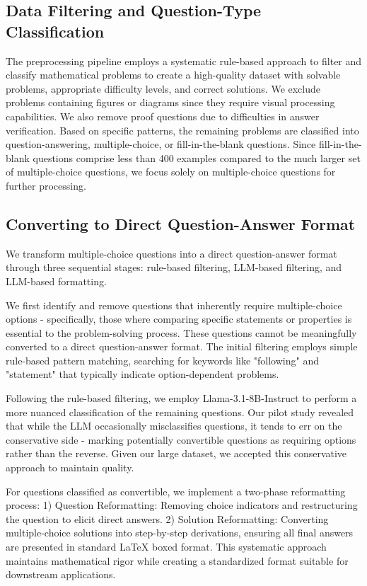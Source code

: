\subsection{Data Filtering and Question-Type Classification}

The preprocessing pipeline employs a systematic rule-based approach to filter and classify mathematical problems to create a high-quality dataset with solvable problems, appropriate difficulty levels, and correct solutions. We exclude problems containing figures or diagrams since they require visual processing capabilities. We also remove proof questions due to difficulties in answer verification. Based on specific patterns, the remaining problems are classified into question-answering, multiple-choice, or fill-in-the-blank questions. Since fill-in-the-blank questions comprise less than 400 examples compared to the much larger set of multiple-choice questions, we focus solely on multiple-choice questions for further processing.

\subsection{Converting to Direct Question-Answer Format}


We transform multiple-choice questions into a direct question-answer format through three sequential stages: rule-based filtering, LLM-based filtering, and LLM-based formatting.

We first identify and remove questions that inherently require multiple-choice options - specifically, those where comparing specific statements or properties is essential to the problem-solving process. These questions cannot be meaningfully converted to a direct question-answer format. The initial filtering employs simple rule-based pattern matching, searching for keywords like "following" and "statement" that typically indicate option-dependent problems.

Following the rule-based filtering, we employ Llama-3.1-8B-Instruct to perform a more nuanced classification of the remaining questions. Our pilot study revealed that while the LLM occasionally misclassifies questions, it tends to err on the conservative side - marking potentially convertible questions as requiring options rather than the reverse. Given our large dataset, we accepted this conservative approach to maintain quality.

For questions classified as convertible, we implement a two-phase reformatting process: 1) Question Reformatting: Removing choice indicators and restructuring the question to elicit direct answers. 2) Solution Reformatting: Converting multiple-choice solutions into step-by-step derivations, ensuring all final answers are presented in standard LaTeX boxed format. This systematic approach maintains mathematical rigor while creating a standardized format suitable for downstream applications.

